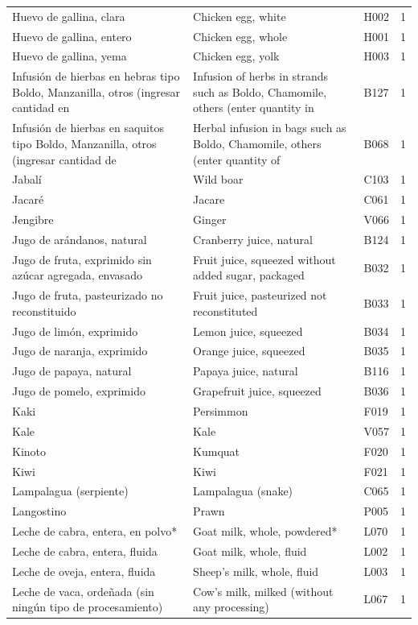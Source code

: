 {\begin{longtable}{p{4.3cm}p{5.5cm}p{1.5cm}p{0.7cm}}
Huevo de gallina, clara & Chicken egg, white & H002 & 1\\
Huevo de gallina, entero & Chicken egg, whole & H001 & 1\\
Huevo de gallina, yema & Chicken egg, yolk & H003 & 1\\
Infusión de hierbas en hebras tipo Boldo, Manzanilla, otros (ingresar cantidad en & Infusion of herbs in strands such as Boldo, Chamomile, others (enter quantity in & B127 & 1\\
Infusión de hierbas en saquitos tipo Boldo, Manzanilla, otros (ingresar cantidad de & Herbal infusion in bags such as Boldo, Chamomile, others (enter quantity of & B068 & 1\\
Jabalí & Wild boar & C103 & 1\\
Jacaré & Jacare & C061 & 1\\
Jengibre & Ginger & V066 & 1\\
Jugo de arándanos, natural & Cranberry juice, natural & B124 & 1\\
Jugo de fruta, exprimido sin azúcar agregada, envasado & Fruit juice, squeezed without added sugar, packaged & B032 & 1\\
Jugo de fruta, pasteurizado no reconstituido & Fruit juice, pasteurized not reconstituted & B033 & 1\\
Jugo de limón, exprimido & Lemon juice, squeezed & B034 & 1\\
Jugo de naranja, exprimido & Orange juice, squeezed & B035 & 1\\
Jugo de papaya, natural & Papaya juice, natural & B116 & 1\\
Jugo de pomelo, exprimido & Grapefruit juice, squeezed & B036 & 1\\
Kaki & Persimmon & F019 & 1\\
Kale & Kale & V057 & 1\\
Kinoto & Kumquat & F020 & 1\\
Kiwi & Kiwi & F021 & 1\\
Lampalagua (serpiente) & Lampalagua (snake) & C065 & 1\\
Langostino & Prawn & P005 & 1\\
Leche de cabra, entera, en polvo* & Goat milk, whole, powdered* & L070 & 1\\
Leche de cabra, entera, fluida & Goat milk, whole, fluid & L002 & 1\\
Leche de oveja, entera, fluida & Sheep's milk, whole, fluid & L003 & 1\\
Leche de vaca, ordeñada (sin ningún tipo de procesamiento) & Cow's milk, milked (without any processing) & L067 & 1\\

\end{longtable}}

